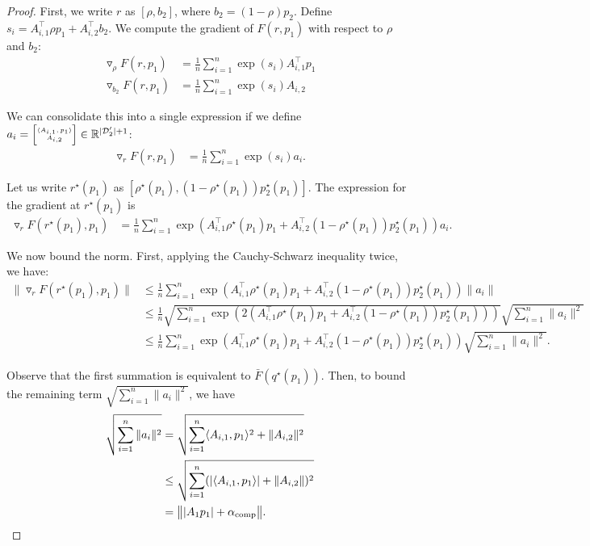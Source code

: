 \begin{proof}

First, we write $r$ as $[\rho, b_2]$, where $b_2 = (1 - \rho)p_2$. Define $s_i = A_{i, 1}^\top \rho p_1 + A_{i, 2}^\top b_2$. We compute the gradient of $F(r, p_1)$ with respect to $\rho$ and $b_2$:
\begin{align*}
    \triangledown_{\rho} F(r, p_1) &= \frac{1}{n} \sum_{i = 1}^n \exp(s_i) A_{i, 1}^\top p_1 \\
    \triangledown_{b_2} F(r, p_1) &= \frac{1}{n} \sum_{i = 1}^n \exp(s_i) A_{i, 2}
\end{align*}

We can consolidate this into a single expression if we define $a_i = \SmallMatrix{ \langle A_{i, 1}, p_1 \rangle \\ A_{i, 2}} \in \R^{|\D_2'| + 1}$:
\begin{align*}
    \triangledown_{r} F(r, p_1) &= \frac{1}{n} \sum_{i = 1}^n \exp(s_i) a_i.
\end{align*}

Let us write $r^\star(p_1)$ as $[\rho^\star(p_1), (1 - \rho^\star(p_1)) p_2^\star(p_1)]$. The expression for the gradient at $r^\star(p_1)$ is
\begin{align*}
    \triangledown_r F(r^\star(p_1), p_1) &= \frac{1}{n}\sum_{i = 1}^n \exp(A_{i, 1}^\top \rho^\star(p_1) p_1 + A_{i, 2}^\top (1 - \rho^\star(p_1)) p_2^\star(p_1)) a_i.
\end{align*}

We now bound the norm. First, applying the Cauchy-Schwarz inequality twice, we have:
\begin{align*}
    \|\triangledown_r F(r^\star(p_1), p_1)\| &\le \frac{1}{n} \sum_{i = 1}^n \exp(A_{i, 1}^\top \rho^\star(p_1) p_1 + A_{i, 2}^\top (1 - \rho^\star(p_1)) p_2^\star(p_1)) \|a_i\| \\
    &\le \frac{1}{n} \sqrt{\sum_{i = 1}^n \exp(2(A_{i, 1}^\top \rho^\star(p_1) p_1 + A_{i, 2}^\top (1 - \rho^\star(p_1)) p_2^\star(p_1)))} \sqrt{\sum_{i = 1}^n \| a_i\|^2} \\
    &\le \frac{1}{n} \sum_{i = 1}^n \exp(A_{i, 1}^\top \rho^\star(p_1) p_1 + A_{i, 2}^\top (1 - \rho^\star(p_1)) p_2^\star(p_1)) \sqrt{\sum_{i = 1}^n \| a_i\|^2}.
\end{align*}

Observe that the first summation is equivalent to $\bar{F}(q^\star(p_1))$. Then, to bound the remaining term $\sqrt{\sum_{i = 1}^n \| a_i\|^2}$, we have
\begin{align*}
\sqrt{\sum_{i = 1}^n \| a_i\|^2} &= \sqrt{\sum_{i = 1}^n \langle A_{i, 1}, p_1 \rangle^2 + \| A_{i, 2}\|^2 } \\
&\le \sqrt{\sum_{i = 1}^n (|\langle A_{i, 1}, p_1 \rangle| + \| A_{i, 2}\|)^2 } \\
&= \big\| | A_1 p_1 | + \alpha_{\text{comp}} \big\|.
\end{align*}


\end{proof}
